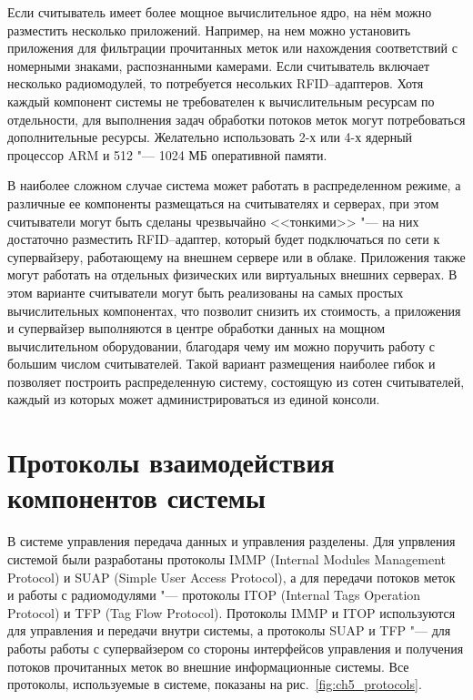 Если считыватель имеет более мощное вычислительное ядро, на нём можно разместить несколько приложений. Например, на нем можно установить приложения для фильтрации прочитанных меток или нахождения соответствий с номерными знаками, распознанными камерами. Если считыватель включает несколько радиомодулей, то потребуется несольких RFID--адаптеров. Хотя каждый компонент системы не требователен к вычислительным ресурсам по отдельности, для выполнения задач обработки потоков меток могут потребоваться дополнительные ресурсы. Желательно использовать 2-х или 4-х ядерный процессор ARM и 512 "--- 1024 МБ оперативной памяти.

В наиболее сложном случае система может работать в распределенном режиме, а различные ее компоненты размещаться на считывателях и серверах, при этом считыватели могут быть сделаны чрезвычайно <<тонкими>> "--- на них достаточно разместить RFID--адаптер, который будет подключаться по сети к супервайзеру, работающему на внешнем сервере или в облаке. Приложения также могут работать на отдельных физических или виртуальных внешних серверах. В этом варианте считыватели могут быть реализованы на самых простых вычислительных компонентах, что позволит снизить их стоимость, а приложения и супервайзер выполняются в центре обработки данных на мощном вычислительном оборудовании, благодаря чему им можно поручить работу с большим числом считывателей. Такой вариант размещения наиболее гибок и позволяет построить распределенную систему, состоящую из сотен считывателей, каждый из которых может администрироваться из единой консоли.



\section{Протоколы взаимодействия компонентов системы}\label{sec:ch5_protocols}

В системе управления передача данных и управления разделены. Для упрвления системой были разработаны протоколы IMMP (Internal Modules Management Protocol) и SUAP (Simple User Access Protocol), а для передачи потоков меток и работы с радиомодулями "--- протоколы ITOP (Internal Tags Operation Protocol) и TFP (Tag Flow Protocol). Протоколы IMMP и ITOP используются для управления и передачи внутри системы, а протоколы SUAP и TFP "--- для работы работы с супервайзером со стороны интерфейсов управления и получения потоков прочитанных меток во внешние информационные системы. Все протоколы, используемые в системе, показаны на рис.~\ref{fig:ch5_protocols}.

